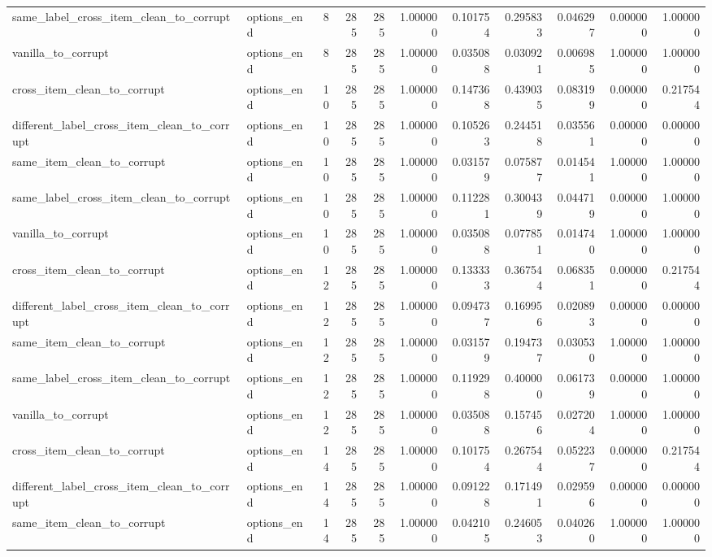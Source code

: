 \begin{tabular}{llrrrrrrrrr}
same\_label\_cross\_item\_clean\_to\_corrupt & options\_end & 8 & 285 & 285 & 1.000000 & 0.101754 & 0.295833 & 0.046297 & 0.000000 & 1.000000 \\
vanilla\_to\_corrupt & options\_end & 8 & 285 & 285 & 1.000000 & 0.035088 & 0.030921 & 0.006985 & 1.000000 & 1.000000 \\
cross\_item\_clean\_to\_corrupt & options\_end & 10 & 285 & 285 & 1.000000 & 0.147368 & 0.439035 & 0.083199 & 0.000000 & 0.217544 \\
different\_label\_cross\_item\_clean\_to\_corrupt & options\_end & 10 & 285 & 285 & 1.000000 & 0.105263 & 0.244518 & 0.035561 & 0.000000 & 0.000000 \\
same\_item\_clean\_to\_corrupt & options\_end & 10 & 285 & 285 & 1.000000 & 0.031579 & 0.075877 & 0.014541 & 1.000000 & 1.000000 \\
same\_label\_cross\_item\_clean\_to\_corrupt & options\_end & 10 & 285 & 285 & 1.000000 & 0.112281 & 0.300439 & 0.044719 & 0.000000 & 1.000000 \\
vanilla\_to\_corrupt & options\_end & 10 & 285 & 285 & 1.000000 & 0.035088 & 0.077851 & 0.014740 & 1.000000 & 1.000000 \\
cross\_item\_clean\_to\_corrupt & options\_end & 12 & 285 & 285 & 1.000000 & 0.133333 & 0.367544 & 0.068351 & 0.000000 & 0.217544 \\
different\_label\_cross\_item\_clean\_to\_corrupt & options\_end & 12 & 285 & 285 & 1.000000 & 0.094737 & 0.169956 & 0.020893 & 0.000000 & 0.000000 \\
same\_item\_clean\_to\_corrupt & options\_end & 12 & 285 & 285 & 1.000000 & 0.031579 & 0.194737 & 0.030530 & 1.000000 & 1.000000 \\
same\_label\_cross\_item\_clean\_to\_corrupt & options\_end & 12 & 285 & 285 & 1.000000 & 0.119298 & 0.400000 & 0.061739 & 0.000000 & 1.000000 \\
vanilla\_to\_corrupt & options\_end & 12 & 285 & 285 & 1.000000 & 0.035088 & 0.157456 & 0.027204 & 1.000000 & 1.000000 \\
cross\_item\_clean\_to\_corrupt & options\_end & 14 & 285 & 285 & 1.000000 & 0.101754 & 0.267544 & 0.052237 & 0.000000 & 0.217544 \\
different\_label\_cross\_item\_clean\_to\_corrupt & options\_end & 14 & 285 & 285 & 1.000000 & 0.091228 & 0.171491 & 0.029596 & 0.000000 & 0.000000 \\
same\_item\_clean\_to\_corrupt & options\_end & 14 & 285 & 285 & 1.000000 & 0.042105 & 0.246053 & 0.040260 & 1.000000 & 1.000000 \\

\end{tabular}
